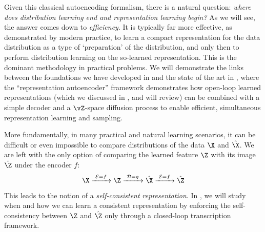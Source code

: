 \documentclass[../../book-main.tex]{subfiles}
\begin{document}
Given this classical autoencoding formalism, there is a natural question:
\textit{where does distribution learning end and representation learning begin?}
As we will see, the answer %
comes down to \textit{efficiency}. It is typically far more
effective, as demonstrated by modern practice, to learn a compact representation
for the data distribution as a type of `preparation' of the distribution,
and only then to perform distribution learning on the so-learned representation.
This is the dominant methodology in practical problems.
We will demonstrate the links between the foundations we have developed in
and the state of the art in ,
where the ``representation autoencoder'' framework demonstrates how open-loop
learned representations (which we discussed in , and will
review)
can be combined with a simple decoder and a $\vZ$-space diffusion process to
enable efficient, simultaneous representation learning and sampling.

More fundamentally, in many practical and natural learning scenarios,
it can be difficult or even impossible to compare distributions of
the data $\X$ and $\hat \X$. We are left with the only option of
comparing the learned feature $\Z$ with its image $\hat \Z$ under the
encoder $f$:
\begin{equation}
    \X
    \xrightarrow{\hspace{1mm} \mathcal{E} = f \hspace{1mm}} \Z
    \xrightarrow{\hspace{1mm} \mathcal{D} = g \hspace{1mm}} \hat{\X}
    \xrightarrow{\hspace{1mm} \mathcal{E} = f \hspace{1mm}} \hat \Z
\end{equation}
This leads to the notion of a {\em self-consistent representation}.
In , we will study when and how we can
learn a consistent representation by enforcing the self-consistency
between $\Z$ and $\hat \Z$ only through a closed-loop transcription framework.
\end{document}
